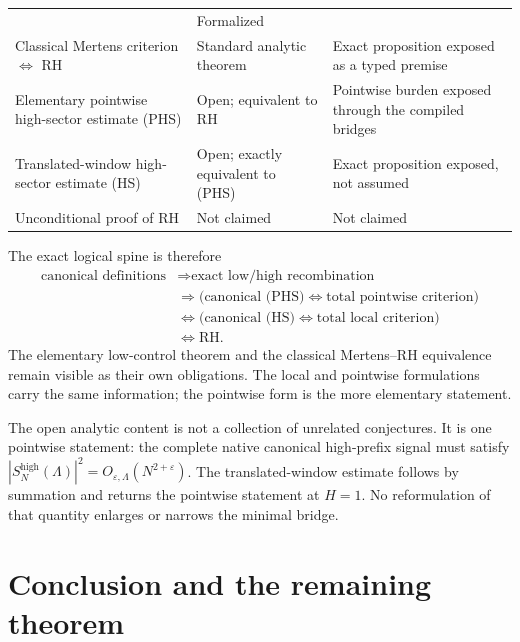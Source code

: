 \documentclass[11pt]{article}
\theoremstyle{definition}
\theoremstyle{remark}
\newcommand{\eps}{\varepsilon}
\newcommand{\1}{\mathbf{1}}
\begin{document}
\begin{table}[htbp]
\begin{tabular}{>{\raggedright\arraybackslash}p{}
                >{\raggedright\arraybackslash}p{}
                >{\raggedright\arraybackslash}p{}}
& Formalized\\
Classical Mertens criterion $\Longleftrightarrow$ RH
& Standard analytic theorem
& Exact proposition exposed as a typed premise\\
Elementary pointwise high-sector estimate (PHS)
& Open; equivalent to RH
& Pointwise burden exposed through the compiled bridges\\
Translated-window high-sector estimate (HS)
& Open; exactly equivalent to (PHS)
& Exact proposition exposed, not assumed\\
Unconditional proof of RH
& Not claimed
& Not claimed\\
\bottomrule
\end{tabular}
\end{table}

The exact logical spine is therefore
\[
 \begin{aligned}
 \text{canonical definitions}
 &\Longrightarrow \text{exact low/high recombination}\\
 &\Longrightarrow
 \bigl(\text{canonical (PHS)}\Longleftrightarrow
       \text{total pointwise criterion}\bigr)\\
 &\Longleftrightarrow
 \bigl(\text{canonical (HS)}\Longleftrightarrow
       \text{total local criterion}\bigr)\\
 &\Longleftrightarrow \mathrm{RH}.
 \end{aligned}
\]
The elementary low-control theorem and the classical Mertens--RH equivalence remain visible as their own obligations.  The local and pointwise formulations carry the same information; the pointwise form is the more elementary statement.

The open analytic content is not a collection of unrelated conjectures.  It is one pointwise statement: the complete native canonical high-prefix signal must satisfy $|S_N^{\mathrm{high}}(\Lambda)|^2=O_{\eps,\Lambda}(N^{2+\eps})$.  The translated-window estimate follows by summation and returns the pointwise statement at $H=1$.  No reformulation of that quantity enlarges or narrows the minimal bridge.

\section{Conclusion and the remaining theorem}
\label{sec:conclusion}
\end{document}
